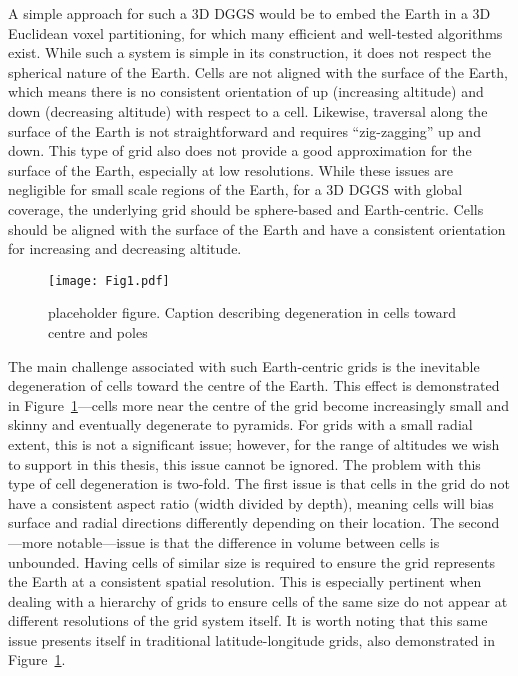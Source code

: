 A simple approach for such a 3D DGGS would be to embed the Earth in a 3D Euclidean voxel partitioning, for which many efficient and well-tested algorithms exist.
While such a system is simple in its construction, it does not respect the spherical nature of the Earth.
Cells are not aligned with the surface of the Earth, which means there is no consistent orientation of up (increasing altitude) and down (decreasing altitude) with respect to a cell.
Likewise, traversal along the surface of the Earth is not straightforward and requires ``zig-zagging'' up and down.
This type of grid also does not provide a good approximation for the surface of the Earth, especially at low resolutions.
While these issues are negligible for small scale regions of the Earth, for a 3D DGGS with global coverage, the underlying grid should be sphere-based and Earth-centric.
Cells should be aligned with the surface of the Earth and have a consistent orientation for increasing and decreasing altitude.


\begin{figure}[h]
	\texttt{[image: Fig1.pdf]}
	\caption{placeholder figure.
		Caption describing degeneration in cells toward centre and poles}
	\label{fig:3dllg}
\end{figure}


The main challenge associated with such Earth-centric grids is the inevitable degeneration of cells toward the centre of the Earth.
This effect is demonstrated in Figure~\ref{fig:3dllg}---cells more near the centre of the grid become increasingly small and skinny and eventually degenerate to pyramids.
For grids with a small radial extent, this is not a significant issue; however, for the range of altitudes we wish to support in this thesis, this issue cannot be ignored.
The problem with this type of cell degeneration is two-fold.
The first issue is that cells in the grid do not have a consistent aspect ratio (width divided by depth), meaning cells will bias surface and radial directions differently depending on their location.
The second---more notable---issue is that the difference in volume between cells is unbounded.
Having cells of similar size is required to ensure the grid represents the Earth at a consistent spatial resolution.
This is especially pertinent when dealing with a hierarchy of grids to ensure cells of the same size do not appear at different resolutions of the grid system itself.
It is worth noting that this same issue presents itself in traditional latitude-longitude grids, also demonstrated in Figure~\ref{fig:3dllg}.


